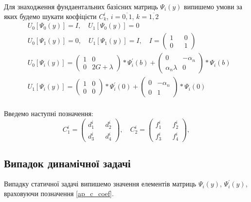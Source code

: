 Для знаходження фундаентальних базісних матриць $\Psi_i(y)$
випишемо умови за яких будемо шукати коєфіцієти $C_k^i$, $i=\overline{0,1}$, $k=\overline{1,2}$
\begin{align*}\tag{Aп.С. 1}\label{ap_c_bound}
    &U_0\left[ \Psi_0(y) \right] = I, \quad U_1\left[ \Psi_0(y) \right] = 0 \\
    &U_0\left[ \Psi_1(y) \right] = 0, \quad U_1\left[ \Psi_1(y) \right] = I, \quad I = \begin{pmatrix}
        1 && 0 \\
        0 && 1
    \end{pmatrix} \\
    &U_0\left[ \Psi_i(y) \right] =  \begin{pmatrix}
        1 & 0 \\
        0 & 2G + \lambda
    \end{pmatrix} * \Psi_i^{'}(b) + \begin{pmatrix}
        0 & -\alpha_n \\
        \alpha_n \lambda & 0
    \end{pmatrix} * \Psi_i(b) \\
    &U_1\left[ \Psi_i(y) \right] =  \begin{pmatrix}
        1 & 0 \\
        0 & 0
    \end{pmatrix} * \Psi_i^{'}(0) + \begin{pmatrix}
        0 & -\alpha_n \\
        0 & 1
    \end{pmatrix} * \Psi_i(0) \\
\end{align*}

Введемо наступні позначення:
\begin{equation*}\tag{Aп.С. 2}\label{ap_c_coef}
    C_1^i = \begin{pmatrix}
        d_1^i && d_2^i \\
        d_3^i && d_4^i
    \end{pmatrix}, \quad
    C_2^i = \begin{pmatrix}
        f_1^i && f_2^i \\
        f_3^i && f_4^i
    \end{pmatrix},
\end{equation*}

\subsection*{Випадок динамічної задачі}
Випадку статичної задачі випишемо значення елементів матриць $\Psi_i(y)$, $\Psi_i^{'}(y)$, враховуючи позначення \eqref{ap_c_coef}.

